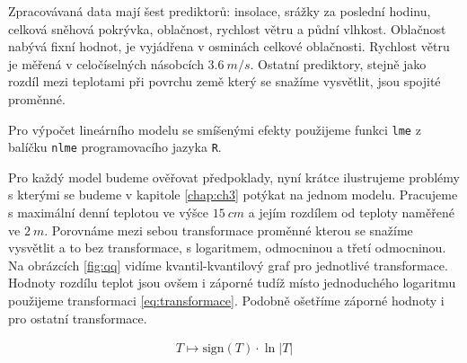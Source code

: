 Zpracovávaná data mají šest prediktorů: insolace, srážky za poslední hodinu, celková sněhová pokrývka, oblačnost, rychlost větru a půdní vlhkost. Oblačnost nabývá fixní hodnot, je vyjádřena v osminách celkové oblačnosti. Rychlost větru je měřená v celočíselných násobcích $\SI{3.6}{m/s}$. Ostatní prediktory, stejně jako rozdíl mezi teplotami při povrchu země který se snažíme vysvětlit, jsou spojité proměnné. 

Pro výpočet lineárního modelu se smíšenými efekty použijeme funkci \texttt{lme} z balíčku \texttt{nlme} programovacího jazyka \texttt{R}.

Pro každý model budeme ověřovat předpoklady, nyní krátce ilustrujeme problémy s kterými se budeme v kapitole \ref{chap:ch3} potýkat na jednom modelu. Pracujeme s maximální denní teplotou ve výšce $\SI{15}{cm}$ a jejím rozdílem od teploty naměřené ve $\SI{2}{m}$. Porovnáme mezi sebou transformace proměnné kterou se snažíme vysvětlit a to bez transformace, s logaritmem, odmocninou a třetí odmocninou. Na obrázcích \ref{fig:qq} vidíme kvantil-kvantilový graf pro jednotlivé transformace. Hodnoty rozdílu teplot jsou ovšem i záporné tudíž místo jednoduchého logaritmu použijeme transformaci \eqref{eq:transformace}. Podobně ošetříme záporné hodnoty i pro ostatní transformace.

\begin{gather*}
T \mapsto \mathrm{sign}(T)\cdot \ln\left|T\right| \label{eq:transformace}
\end{gather*}

